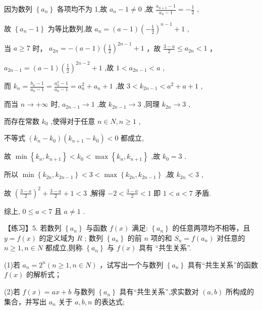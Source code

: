 \documentclass[10pt]{article}
\newcommand*\circled[1]{\tikz[baseline=(char.base)]{\node[shape=circle,draw,inner sep=1.5pt] (char) {\small #1};}}
\begin{document}
因为数列 \(\left\{  {a}_{n}\right\}\) 各项均不为 1,故 \({a}_{n} - 1 \neq  0\) ,故 \(\frac{{a}_{n + 1} - 1}{{a}_{n} - 1} =  - \frac{1}{2}\) ,

故 \(\left\{  {{a}_{n} - 1}\right\}\) 为等比数列,故 \({a}_{n} = \left( {a - 1}\right) {\left( -\frac{1}{2}\right) }^{n - 1} + 1\) ,

当 \(a \geq  7\) 时， \({a}_{2n} =  - \left( {a - 1}\right) {\left( \frac{1}{2}\right) }^{{2n} - 1} + 1\) ，故 \(\frac{3 - a}{2} \leq  {a}_{2n} < 1\) ，

\({a}_{{2n} - 1} = \left( {a - 1}\right) {\left( \frac{1}{2}\right) }^{{2n} - 2} + 1\) ,故 \(1 < {a}_{{2n} - 1} < a\) ,

而 \({k}_{n} = \frac{{b}_{n} - 1}{{a}_{n} - 1} = \frac{{a}_{n}^{3} - 1}{{a}_{n} - 1} = {a}_{n}^{2} + {a}_{n} + 1\) ,故 \(3 < {k}_{{2n} - 1} < {a}^{2} + a + 1\) ,

而当 \(n \rightarrow   + \infty\) 时, \({a}_{{2n} - 1} \rightarrow  1\) ,故 \({k}_{{2n} - 1} \rightarrow  3\) ,同理 \({k}_{2n} \rightarrow  3\) ,

而存在常数 \({k}_{0}\) ,使得对于任意 \(n \in  N,n \geq  1\) ,

不等式 \(\left( {{k}_{n} - {k}_{0}}\right) \left( {{k}_{n + 1} - {k}_{0}}\right)  < 0\) 都成立,

故 \(\min \left\{  {{k}_{n},{k}_{n + 1}}\right\}   < {k}_{0} < \max \left\{  {{k}_{n},{k}_{n + 1}}\right\}\) ,故 \({k}_{0} = 3\) .

所以 \(\min \left\{  {{k}_{2n},{k}_{{2n} - 1}}\right\}   < 3 < \max \left\{  {{k}_{2n},{k}_{{2n} - 1}}\right\}\) ,故 \({k}_{2n} < 3\) ,

故 \({\left( \frac{3 - a}{2}\right) }^{2} + \frac{3 - a}{2} + 1 < 3\) ,解得 \(- 2 < \frac{3 - a}{2} < 1\) 即 \(1 < a < 7\) 矛盾.

综上, \(0 \leq  a < 7\) 且 \(a \neq  1\) .

【练习】5. 若数列 \(\left\{  {a}_{n}\right\}\) 与函数 \(f\left( x\right)\) 满足:  \circled{1}  \(\left\{  {a}_{n}\right\}\) 的任意两项均不相等，且 \(y = f\left( x\right)\) 的定义域为 \(R\) ;  \circled{2}  数列 \(\left\{  {a}_{n}\right\}\) 的前 \(n\) 项的和 \({S}_{n} = f\left( {a}_{n}\right)\) 对任意的 \(n \geq  1,n \in  N\) 都成立,则称 \(\left\{  {a}_{n}\right\}\) 与 \(f\left( x\right)\) 具有 “共生关系”.

(1)若 \({a}_{n} = {2}^{n}\left( {n \geq  1,n \in  N}\right)\) ，试写出一个与数列 \(\left\{  {a}_{n}\right\}\) 具有“共生关系”的函数 \(f\left( x\right)\) 的解析式；

(2)若 \(f\left( x\right)  = {ax} + b\) 与数列 \(\left\{  {a}_{n}\right\}\) 具有“共生关系”,求实数对 \(\left( {a,b}\right)\) 所构成的集合，并写出 \({a}_{n}\) 关于 \(a,b,n\) 的表达式;
\end{document}
